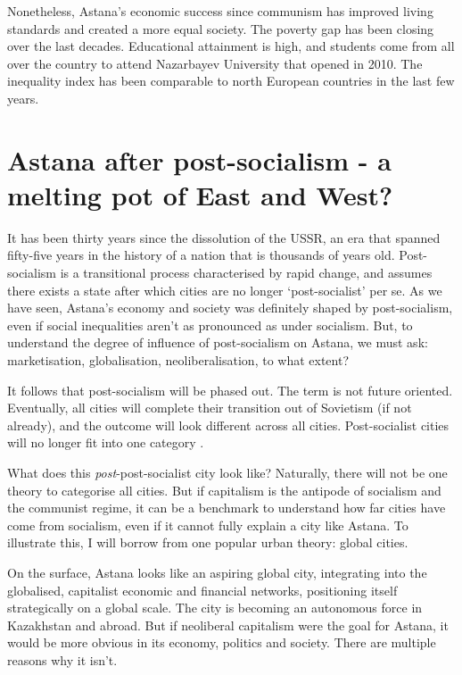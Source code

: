 \documentclass{article}
\begin{document}
Nonetheless, Astana's economic success since communism has improved living standards and created a more equal society. The poverty gap has been closing over the last decades. Educational attainment is high, and students come from all over the country to attend Nazarbayev University that opened in 2010. The inequality index has been comparable to north European countries in the last few years.

\section{Astana after post-socialism - a melting pot of East and West?}

It has been thirty years since the dissolution of the USSR, an era that spanned fifty-five years in the history of a nation that is thousands of years old. Post-socialism is a transitional process characterised by rapid change, and assumes there exists a state after which cities are no longer `post-socialist' per se. 
As we have seen, Astana's economy and society was definitely shaped by post-socialism, even if social inequalities aren't as pronounced as under socialism. But, to understand the degree of influence of post-socialism on Astana, we must ask: marketisation, globalisation, neoliberalisation, to what extent?

It follows that post-socialism will be phased out. The term is not future oriented. Eventually, all cities will complete their transition out of Sovietism (if not already), and the outcome will look different across all cities. Post-socialist cities will no longer fit into one category \parencite{hirt2016conceptual}.

What does this \textit{post}-post-socialist city look like? 
Naturally, there will not be one theory to categorise all cities. But if capitalism is the antipode of socialism and the communist regime, it can be a benchmark to understand how far cities have come from socialism, even if it cannot fully explain a city like Astana. To illustrate this, I will borrow from one popular urban theory: global cities.

On the surface, Astana looks like an aspiring global city, integrating into the globalised, capitalist economic and financial networks, positioning itself strategically on a global scale. The city is becoming an autonomous force in Kazakhstan and abroad.
But if neoliberal capitalism were the goal for Astana, it would be more obvious in its economy, politics and society. There are multiple reasons why it isn't.
\end{document}
